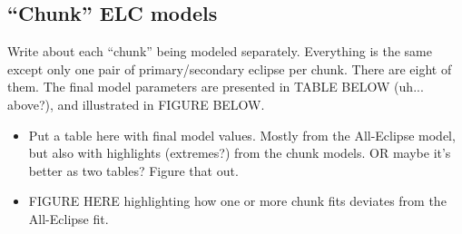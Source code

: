 \subsection{``Chunk'' ELC models}
Write about each ``chunk'' being modeled separately. Everything is the same except only one pair of primary/secondary eclipse per chunk. There are eight of them. The final model parameters are presented in TABLE BELOW (uh... above?), and illustrated in FIGURE BELOW.

\begin{itemize}
\item Put a table here with final model values. Mostly from the All-Eclipse model, but also with highlights (extremes?) from the chunk models. OR maybe it's better as two tables? Figure that out.
\item FIGURE HERE highlighting how one or more chunk fits deviates from the All-Eclipse fit.
\end{itemize}